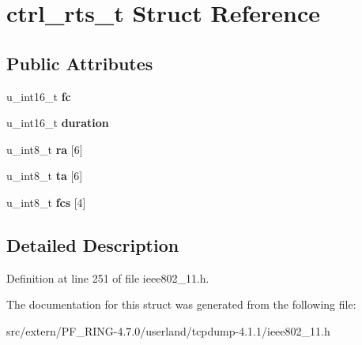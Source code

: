 \hypertarget{structctrl__rts__t}{
\section{ctrl\_\-rts\_\-t Struct Reference}
\label{structctrl__rts__t}
}
\subsection*{Public Attributes}
\begin{DoxyCompactItemize}
\item 
\hypertarget{structctrl__rts__t_afe4dcdf061e2ffbbab4fcd4a42b83ea5}{
u\_\-int16\_\-t {\bfseries fc}}
\label{structctrl__rts__t_afe4dcdf061e2ffbbab4fcd4a42b83ea5}

\item 
\hypertarget{structctrl__rts__t_a26d95abb34b743b5303553e615946c8d}{
u\_\-int16\_\-t {\bfseries duration}}
\label{structctrl__rts__t_a26d95abb34b743b5303553e615946c8d}

\item 
\hypertarget{structctrl__rts__t_a86119220ba892362f6fb522a6cb1dba0}{
u\_\-int8\_\-t {\bfseries ra} \mbox{[}6\mbox{]}}
\label{structctrl__rts__t_a86119220ba892362f6fb522a6cb1dba0}

\item 
\hypertarget{structctrl__rts__t_a7bb0ca6c03df2217f749142fd8a1dd3a}{
u\_\-int8\_\-t {\bfseries ta} \mbox{[}6\mbox{]}}
\label{structctrl__rts__t_a7bb0ca6c03df2217f749142fd8a1dd3a}

\item 
\hypertarget{structctrl__rts__t_a2c735e1bf8cde36809d5b5eb8d6085ec}{
u\_\-int8\_\-t {\bfseries fcs} \mbox{[}4\mbox{]}}
\label{structctrl__rts__t_a2c735e1bf8cde36809d5b5eb8d6085ec}

\end{DoxyCompactItemize}


\subsection{Detailed Description}


Definition at line 251 of file ieee802\_\-11.h.



The documentation for this struct was generated from the following file:\begin{DoxyCompactItemize}
\item 
src/extern/PF\_\-RING-\/4.7.0/userland/tcpdump-\/4.1.1/ieee802\_\-11.h\end{DoxyCompactItemize}
